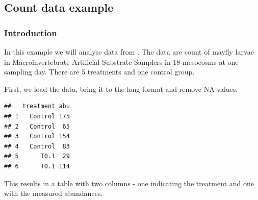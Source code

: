 
\subsection{Count data example}
\subsubsection{Introduction}
In this example we will analyse data from \citep{brock_minimum_2015}.
The data are count of mayfly larvae in Macroinvertebrate Artificial Substrate Samplers in 18 mesocosms at one sampling day.
There are 5 treatments and one control group.

First, we load the data, bring it to the long format and remove NA values.
\begin{knitrout}
\color{fgcolor}\small\begin{kframe}
\begin{alltt}
 \hlkwb{<-} \hlstd{(} \hlstd{=} \hlstd{,}
                  \hlstd{=} \hlstd{)}
 \hlkwb{<-}   \hlstd{=} \hlstd{,}  \hlstd{=} \hlstd{)}
 \hlkwb{<-} \hlstd{dfm[}\hlopt{!}\hlstd{(dfm[}\hlstd{]), ]}
\end{alltt}
\begin{verbatim}
##   treatment abu
## 1   Control 175
## 2   Control  65
## 3   Control 154
## 4   Control  83
## 5      T0.1  29
## 6      T0.1 114
\end{verbatim}
\end{kframe}
\end{knitrout}
This results in a table with two columns - one indicating the treatment and one with the measured abundances.

